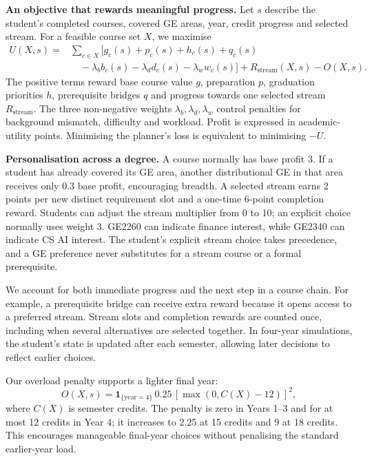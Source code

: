 \documentclass{article}
\begin{document}
\newpage
\textbf{An objective that rewards meaningful progress.} Let $s$ describe the student's completed courses, covered GE areas, year, credit progress and selected stream. For a feasible course set $X$, we maximise
\begin{align}
U(X,s)={}&\sum_{c\in X}\bigl[g_c(s)+p_c(s)+h_c(s)+q_c(s)\nonumber\\
&\quad-\lambda_b b_c(s)-\lambda_d d_c(s)-\lambda_w w_c(s)\bigr]
+R_{\mathrm{stream}}(X,s)-O(X,s). \label{eq:utility}
\end{align}
The positive terms reward base course value $g$, preparation $p$, graduation priorities $h$, prerequisite bridges $q$ and progress towards one selected stream $R_{\mathrm{stream}}$. The three non-negative weights $\lambda_b,\lambda_d,\lambda_w$ control penalties for background mismatch, difficulty and workload. Profit is expressed in academic-utility points. Minimising the planner's loss is equivalent to minimising $-U$.

\textbf{Personalisation across a degree.} A course normally has base profit 3. If a student has already covered its GE area, another distributional GE in that area receives only 0.3 base profit, encouraging breadth. A selected stream earns 2 points per new distinct requirement slot and a one-time 6-point completion reward. Students can adjust the stream multiplier from 0 to 10; an explicit choice normally uses weight 3. GE2260 can indicate finance interest, while GE2340 can indicate CS AI interest. The student's explicit stream choice takes precedence, and a GE preference never substitutes for a stream course or a formal prerequisite.

We account for both immediate progress and the next step in a course chain. For example, a prerequisite bridge can receive extra reward because it opens access to a preferred stream. Stream slots and completion rewards are counted once, including when several alternatives are selected together. In four-year simulations, the student's state is updated after each semester, allowing later decisions to reflect earlier choices.

Our overload penalty supports a lighter final year:
\begin{equation}
O(X,s)=\mathbf{1}_{\{\mathrm{year}=4\}}\,0.25\,[\max(0,C(X)-12)]^2,
\end{equation}
where $C(X)$ is semester credits. The penalty is zero in Years 1--3 and for at most 12 credits in Year 4; it increases to 2.25 at 15 credits and 9 at 18 credits. This encourages manageable final-year choices without penalising the standard earlier-year load.
\end{document}
